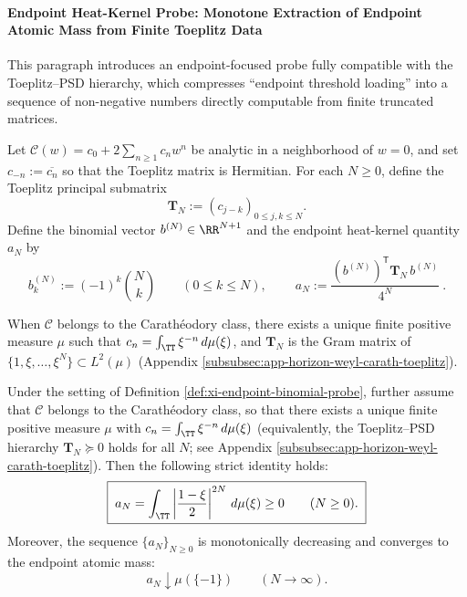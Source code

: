 \paragraph{Endpoint Heat-Kernel Probe: Monotone Extraction of Endpoint Atomic Mass from Finite Toeplitz Data}
This paragraph introduces an endpoint-focused probe fully compatible with the Toeplitz--PSD hierarchy, which compresses ``endpoint threshold loading'' into a sequence of non-negative numbers directly computable from finite truncated matrices.

\begin{definition}\label{def:xi-endpoint-binomial-probe}
Let \(\mathscr{C}(w)=c_0+2\sum_{n\ge 1}c_n w^n\) be analytic in a neighborhood of \(w=0\), and set \(c_{-n}:=\overline{c_n}\) so that the Toeplitz matrix is Hermitian.
For each \(N\ge 0\), define the Toeplitz principal submatrix
\[
\mathbf{T}_N:=(c_{j-k})_{0\le j,k\le N}.
\]
Define the binomial vector \(b^{(N)}\in\RR^{N+1}\) and the endpoint heat-kernel quantity \(a_N\) by
\[
b^{(N)}_k:=(-1)^k\binom{N}{k}\qquad(0\le k\le N),
\qquad
\boxed{\ a_N:=\frac{(b^{(N)})^{\mathsf T}\mathbf{T}_N\,b^{(N)}}{4^N}\ }.
\]
\par
When \(\mathscr{C}\) belongs to the Carath\'eodory class, there exists a unique finite positive measure \(\mu\) such that \(c_n=\int_{\TT}\xi^{-n}\,d\mu(\xi)\), and \(\mathbf{T}_N\) is the Gram matrix of \(\{1,\xi,\dots,\xi^N\}\subset L^2(\mu)\) (Appendix \ref{subsubsec:app-horizon-weyl-carath-toeplitz}).
\end{definition}

\begin{theorem}\label{thm:xi-endpoint-heat-kernel-probe}
Under the setting of Definition \ref{def:xi-endpoint-binomial-probe}, further assume that \(\mathscr{C}\) belongs to the Carath\'eodory class,
so that there exists a unique finite positive measure \(\mu\) with \(c_n=\int_{\TT}\xi^{-n}\,d\mu(\xi)\) (equivalently, the Toeplitz--PSD hierarchy \(\mathbf{T}_N\succeq 0\) holds for all \(N\); see Appendix \ref{subsubsec:app-horizon-weyl-carath-toeplitz}).
Then the following strict identity holds:
\begin{equation}\label{eq:xi-endpoint-heat-kernel-identity}
\boxed{\;
a_N=\int_{\TT}\left|\frac{1-\xi}{2}\right|^{2N}\,d\mu(\xi)\ge 0\qquad(N\ge 0).
\;}
\end{equation}
Moreover, the sequence \(\{a_N\}_{N\ge 0}\) is monotonically decreasing and converges to the endpoint atomic mass:
\begin{equation}\label{eq:xi-endpoint-heat-kernel-limit}
\boxed{\;
a_N\downarrow \mu(\{-1\})\qquad(N\to\infty).
\;}
\end{equation}
\end{theorem}

